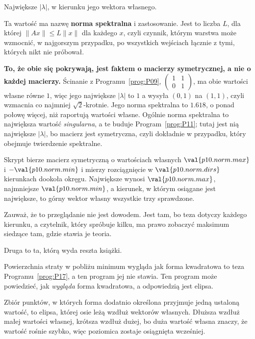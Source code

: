 \begin{fr}
\begin{ansblock}
Największe $\lvert\lambda\rvert$, w kierunku jego wektora własnego.
\end{ansblock}

Ta wartość ma nazwę \dash{} \textbf{norma spektralna} \dash{} i zastosowanie.
Jest to liczba $L$, dla której $\lVert Ax \rVert \le L\lVert x \rVert$ dla
każdego $x$, czyli czynnik, którym warstwa może wzmocnić, w najgorszym
przypadku, po wszystkich wejściach łącznie z tymi, których nikt nie próbował.

\begin{warning}
\textbf{To, że obie się pokrywają, jest faktem o macierzy symetrycznej, a nie
o każdej macierzy.} Ścinanie z Programu~\ref{prog:P09},
$\left(\begin{smallmatrix} 1 & 1 \\ 0 & 1 \end{smallmatrix}\right)$, ma obie
wartości własne równe $1$, więc jego największe $\lvert\lambda\rvert$ to $1$
\dash{} a wysyła $(0, 1)$ na $(1, 1)$, czyli wzmacnia co najmniej
$\sqrt{2}$-krotnie. Jego norma spektralna to $\num{1.618}$, o ponad połowę
więcej, niż raportują wartości własne. Ogólnie norma spektralna to największa
wartość \emph{singularna}, a te buduje Program~\ref{prog:P11}; tutaj jest nią
największe $\lvert\lambda\rvert$, bo macierz jest symetryczna, czyli dokładnie
w przypadku, który obejmuje twierdzenie spektralne.
\end{warning}

Skrypt bierze macierz symetryczną o wartościach własnych $\val{p10.norm.max}$ i
$-\val{p10.norm.min}$ i mierzy rozciągnięcie w $\val{p10.norm.dirs}$ kierunkach
dookoła okręgu. Największe wynosi $\val{p10.norm.max}$, najmniejsze
$\val{p10.norm.min}$, a kierunek, w którym osiągane jest największe, to górny
wektor własny \dash{} wszystkie trzy sprawdzone.

Zauważ, że to przeglądanie nie jest dowodem. Jest tam, bo teza dotyczy każdego
kierunku, a czytelnik, który spróbuje kilku, ma prawo zobaczyć maksimum
siedzące tam, gdzie stawia je teoria.
\end{fr}

\begin{fr}
Druga to ta, którą wyda reszta książki.

Powierzchnia straty w pobliżu minimum wygląda jak forma kwadratowa \dash{} to
teza Programu~\ref{prog:P17}, a ten program jej nie stawia. Ten program może
powiedzieć, jak \emph{wygląda} forma kwadratowa, a odpowiedzią jest elipsa.

Zbiór punktów, w których forma dodatnio określona przyjmuje jedną ustaloną
wartość, to elipsa, której osie leżą wzdłuż wektorów własnych. Dłuższa wzdłuż
małej wartości własnej, krótsza wzdłuż dużej, bo duża wartość własna znaczy, że
wartość rośnie szybko, więc poziomica zostaje osiągnięta wcześniej.
\end{fr}

